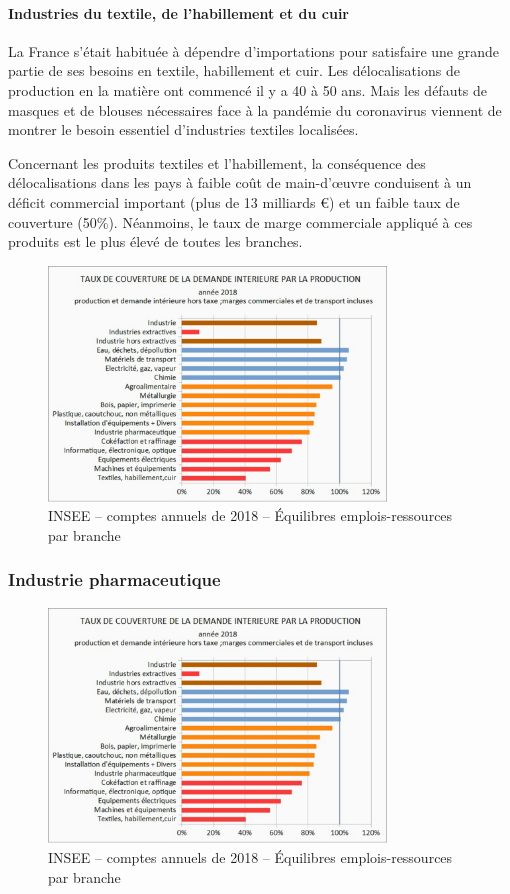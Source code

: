 \documentclass[a4paper]{article}
\begin{document}
\paragraph{Industries du textile, de l’habillement et du cuir}
La France s’était habituée à dépendre d’importations pour satisfaire une grande partie de ses besoins en textile, habillement et cuir.  Les délocalisations de production en la matière ont commencé il y a 40 à 50 ans. Mais les défauts de masques et de blouses nécessaires face à la pandémie du coronavirus viennent de montrer le besoin essentiel d’industries textiles localisées. 

Concernant les produits textiles et l’habillement, la conséquence des délocalisations dans les pays à faible coût de main-d’œuvre conduisent à un déficit commercial important (plus de 13 milliards €) et un faible taux de couverture (50\%).  Néanmoins, le taux de marge commerciale appliqué à ces produits est le plus élevé de toutes les branches. 

\begin{figure}[H]
    \centering
    \includegraphics*[width=0.8\textwidth]{images/couverture}
    \caption{INSEE – comptes annuels de 2018 – Équilibres emplois-ressources par branche}
    \label{fig:couverture}
\end{figure}

\subsubsection{Industrie pharmaceutique}

\begin{figure}[H]
    \centering
    \includegraphics*[width=0.8\textwidth]{images/couverture}
    \caption{INSEE – comptes annuels de 2018 – Équilibres emplois-ressources par branche}
    \label{fig:couverture}
\end{figure}
\end{document}
